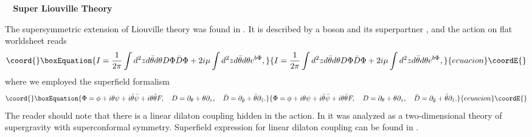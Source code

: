 \documentclass[a4paper,12pt]{article}
\def\section#1{
    \addtocounter{section}{1}\setcounter{subsection}{0}\setcounter{equation}{0}
    \vskip8mm\begin{center}{\bf\thesection~#1}\end{center}}
\begin{document}
\section{\coordHE{} Super Liouville Theory}%

   The supersymmetric extension of Liouville theory was found
 in \cite{Polyakov2}.
 It is described by a boson \myHighlight{$\phi$}\coordHE{} and its superpartner \myHighlight{$\psi$}\coordHE{},
 and the action on flat worldsheet reads
\begin{equation}\coord{}\boxEquation{
  I = \frac{1}{2\pi}\int d^2zd\bar{\theta}d\theta D\Phi\bar{D}\Phi
     +2i\mu\int d^2zd\bar{\theta}d\theta e^{b\Phi},
}{
  I = \frac{1}{2\pi}\int d^2zd\bar{\theta}d\theta D\Phi\bar{D}\Phi
     +2i\mu\int d^2zd\bar{\theta}d\theta e^{b\Phi},
}{ecuacion}\coordE{}\end{equation}
 where we employed the superfield formalism
\begin{equation}\coord{}\boxEquation{
  \Phi= \phi+i\theta\psi+i\bar{\theta}\bar{\psi}+i\theta\bar{\theta}F,~~~
  D=\partial_\theta+\theta\partial_z,~~~
  \bar{D}=\partial_{\bar{\theta}}+\bar{\theta}\partial_{\bar{z}}.
}{
  \Phi= \phi+i\theta\psi+i\bar{\theta}\bar{\psi}+i\theta\bar{\theta}F,~~~
  D=\partial_\theta+\theta\partial_z,~~~
  \bar{D}=\partial_{\bar{\theta}}+\bar{\theta}\partial_{\bar{z}}.
}{ecuacion}\coordE{}\end{equation}
 The reader should note that there is a linear dilaton coupling
 hidden in the action.
 In \cite{DHK} it was analyzed as a two-dimensional theory of
 supergravity with superconformal symmetry.
 Superfield expression for linear dilaton coupling
 can be found in \cite{CKT}.
\end{document}
